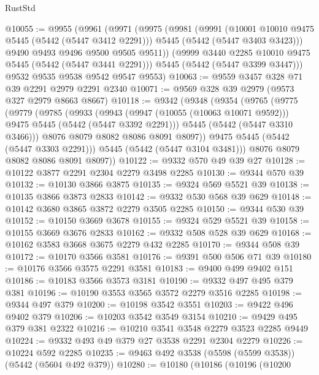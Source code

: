 \begin{lexlean}{RustStd}
\begin{coremodule}
@10055 := @9955
    (@9961
      (@9971
        (@9975
          (@9981
            (@9991
              (@10001 @10010 @9475 @5445 (@5442 (@5447 @3412 @2291)))
              @5445
              (@5442 (@5447 @3403 @3423)))
            @9490
            @9493
            @9496
            @9500
            @9505
            @9511))
        (@9999 @3440 @2285 @10010 @9475 @5445 (@5442 (@5447 @3441 @2291)))
        @5445
        (@5442 (@5447 @3399 @3447)))
      @9532
      @9535
      @9538
      @9542
      @9547
      @9553)
@10063 := @9559 @3457 @328 @71 @39 @2291 @2979 @2291 @2340
@10071 := @9569 @328 @39 @2979 (@9573 @327 @2979 @8663 @8667)
@10118 := @9342
    (@9348
      (@9354
        (@9765
          (@9775
            (@9779
              (@9785
                (@9933
                  (@9943
                    (@9947 (@10055 (@10063 @10071 @9592)))
                    @9475
                    @5445
                    (@5442 (@5447 @3392 @2291)))
                  @5445
                  (@5442 (@5447 @3310 @3466)))
                @8076
                @8079
                @8082
                @8086
                @8091
                @8097))
            @9475
            @5445
            (@5442 (@5447 @3303 @2291)))
          @5445
          (@5442 (@5447 @3104 @3481)))
        @8076
        @8079
        @8082
        @8086
        @8091
        @8097))
@10122 := @9332 @570 @49 @39 @27
@10128 := @10122 @3877 @2291 @2304 @2279 @3498 @2285
@10130 := @9344 @570 @39
@10132 := @10130 @3866 @3875
@10135 := @9324 @569 @5521 @39
@10138 := @10135 @3866 @3873 @2833
@10142 := @9332 @530 @568 @39 @629
@10148 := @10142 @3680 @3865 @3872 @2279 @3505 @2285
@10150 := @9344 @530 @39
@10152 := @10150 @3669 @3678
@10155 := @9324 @529 @5521 @39
@10158 := @10155 @3669 @3676 @2833
@10162 := @9332 @508 @528 @39 @629
@10168 := @10162 @3583 @3668 @3675 @2279 @432 @2285
@10170 := @9344 @508 @39
@10172 := @10170 @3566 @3581
@10176 := @9391 @500 @506 @71 @39
@10180 := @10176 @3566 @3575 @2291 @3581
@10183 := @9400 @499 @9402 @151
@10186 := @10183 @3566 @3573 @3181
@10190 := @9332 @497 @495 @379 @381
@10196 := @10190 @3553 @3565 @3572 @2279 @3516 @2285
@10198 := @9344 @497 @379
@10200 := @10198 @3542 @3551
@10203 := @9422 @496 @9402 @379
@10206 := @10203 @3542 @3549 @3154
@10210 := @9429 @495 @379 @381 @2322
@10216 := @10210 @3541 @3548 @2279 @3523 @2285 @9449
@10224 := @9332 @493 @49 @379 @27 @3538 @2291 @2304 @2279
@10226 := @10224 @592 @2285
@10235 := @9463 @492 @3538 (@5598 (@5599 @3538)) (@5442 (@5604 @492 @379))
@10280 := @10180
    (@10186
      (@10196
        (@10200

\end{coremodule}
\end{lexlean}
